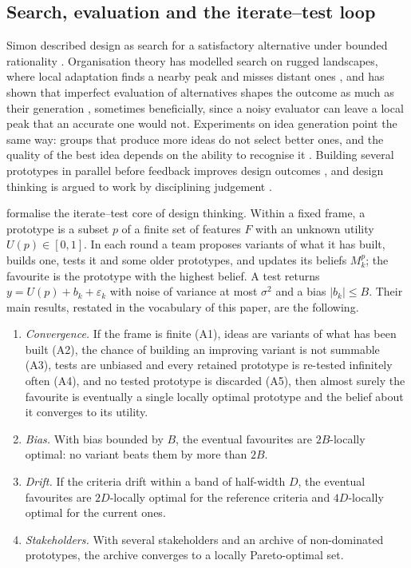 \documentclass[preprint,12pt,authoryear]{elsarticle}
\theoremstyle{definition}
\begin{document}
\subsection{Search, evaluation and the iterate--test loop}

Simon described design as search for a satisfactory alternative under bounded rationality \citep{simon1996}. Organisation theory has modelled search on rugged landscapes, where local adaptation finds a nearby peak and misses distant ones \citep{levinthal1997, march1991, kauffman1993}, and has shown that imperfect evaluation of alternatives shapes the outcome as much as their generation \citep{knudsen2007}, sometimes beneficially, since a noisy evaluator can leave a local peak that an accurate one would not. Experiments on idea generation point the same way: groups that produce more ideas do not select better ones, and the quality of the best idea depends on the ability to recognise it \citep{girotra2010}. Building several prototypes in parallel before feedback improves design outcomes \citep{dow2010}, and design thinking is argued to work by disciplining judgement \citep{liedtka2015, micheli2019}.

\citet{kuras2026} formalise the iterate--test core of design thinking. Within a fixed frame, a prototype is a subset $p$ of a finite set of features $F$ with an unknown utility $U(p)\in[0,1]$. In each round a team proposes variants of what it has built, builds one, tests it and some older prototypes, and updates its beliefs $M^p_k$; the favourite is the prototype with the highest belief. A test returns $y=U(p)+b_k+\varepsilon_k$ with noise of variance at most $\sigma^2$ and a bias $|b_k|\le B$. Their main results, restated in the vocabulary of this paper, are the following.

\begin{enumerate}[leftmargin=*,label=(T\arabic*),itemsep=2pt]
\item \emph{Convergence.} If the frame is finite (A1), ideas are variants of what has been built (A2), the chance of building an improving variant is not summable (A3), tests are unbiased and every retained prototype is re-tested infinitely often (A4), and no tested prototype is discarded (A5), then almost surely the favourite is eventually a single locally optimal prototype and the belief about it converges to its utility.
\item \emph{Bias.} With bias bounded by $B$, the eventual favourites are $2B$-locally optimal: no variant beats them by more than $2B$.
\item \emph{Drift.} If the criteria drift within a band of half-width $D$, the eventual favourites are $2D$-locally optimal for the reference criteria and $4D$-locally optimal for the current ones.
\item \emph{Stakeholders.} With several stakeholders and an archive of non-dominated prototypes, the archive converges to a locally Pareto-optimal set.
\end{enumerate}
\end{document}
